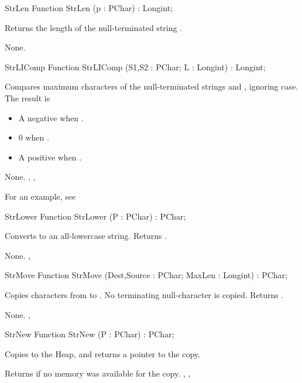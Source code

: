 \html{}
\begin{function}{StrLen}
\Declaration
Function StrLen (p : PChar) : Longint;

\Description

Returns the length of the null-terminated string .

\Errors
None.
\SeeAlso
{}
\end{function}
\html{}
\begin{function}{StrLIComp}
\Declaration
Function StrLIComp (S1,S2 : PChar; L : Longint) : Longint;

\Description

Compares maximum  characters of the null-terminated strings  
and , ignoring case.
The result is 
\begin{itemize}
\item A negative  when .
\item 0 when .
\item A positive  when .
\end{itemize}

\Errors
None.
\SeeAlso
{}, , 
\end{function}
For an example, see 
\begin{function}{StrLower}
\Declaration
Function StrLower (P : PChar) : PChar;

\Description

Converts  to an all-lowercase string. Returns .

\Errors
None.
\SeeAlso
{}, 
\end{function}
\html{}
\begin{function}{StrMove}
\Declaration
Function StrMove (Dest,Source : PChar; MaxLen : Longint) : PChar;

\Description

Copies  characters from  to . No
terminating null-character is copied.
Returns .

\Errors
None.
\SeeAlso
{}, 
\end{function}
\html{}
\begin{function}{StrNew}
\Declaration
Function StrNew (P : PChar) : PChar;

\Description

Copies  to the Heap, and returns a pointer to the copy.

\Errors
Returns  if no memory was available for the copy.
\SeeAlso
{}, , 
\end{function}
